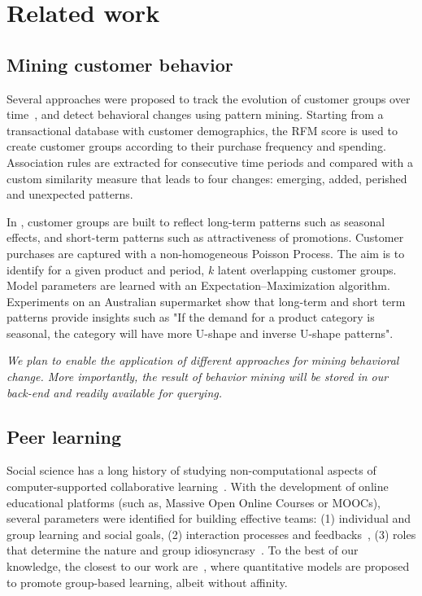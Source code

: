 \documentclass[11pt]{article}
\begin{document}
\section{Related work}

\subsection{Mining customer behavior}
Several approaches were proposed to track the evolution of customer groups over time~\cite{DBLP:conf/vldb/KiferBG04, ijcai2017-336}, and detect behavioral changes using pattern mining. Starting from a transactional database with customer demographics, the RFM score  \cite{miglausch2000thoughts} is used to create customer groups according to their purchase frequency and spending. Association rules are extracted for consecutive time periods and compared with a custom similarity measure that leads to four changes: emerging, added, perished and unexpected patterns.

In \cite{10.1145/2983323.2983665}, customer groups are built to reflect long-term patterns such as seasonal effects, and short-term patterns such as attractiveness of promotions. Customer purchases  are captured with a non-homogeneous Poisson Process.  The aim is to identify for a given product and period, $k$ latent overlapping customer groups. Model parameters are learned with an Expectation–Maximization algorithm. Experiments on an Australian supermarket show that long-term and short term patterns provide insights such as "If the demand for a product category is seasonal, the category will have more U-shape and inverse U-shape patterns".

{\em We plan to enable the application of different approaches for mining behavioral change. More importantly, the result of behavior mining will be stored in our back-end and readily available for querying.}

\subsection{Peer learning}  
Social science has a long history of studying non-computational aspects of computer-supported collaborative learning~\cite{cohen1994restructuring,daradoumis2002supporting}. With the development of online educational platforms (such as, Massive Open Online Courses or MOOCs), several parameters were identified for building effective teams: (1) individual and group learning and social goals, (2) interaction processes and
feedbacks~\cite{srba2015dynamic}, (3) roles that determine the nature and group idiosyncrasy~\cite{daradoumis2002supporting}. To the best of our knowledge, the closest to our work are~\cite{agar2,agar3,agar1}, where quantitative models are
proposed to promote group-based learning, albeit without affinity.
\end{document}
